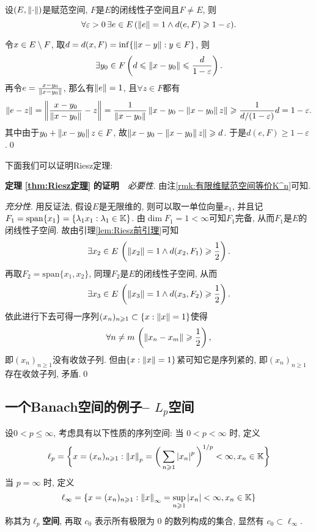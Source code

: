     \begin{Lemma}\label{lem:Riesz前引理}
    设$ (E,\left\| \cdot \right\|) $是赋范空间, $ F $是$ E $的闭线性子空间且$ F\ne E $, 则
    \[
    \forall\varepsilon>0\,\exists e\in E\,(\left\| e \right\|=1\land d(e,F)\geqslant 1-\varepsilon).
    \]
    \end{Lemma}
    \begin{Proof}
    令$ x\in E\setminus F $, 取$ d=d(x,F)=\inf\{ \left\| x-y \right\| : y\in F \} $, 则
    \[
    \exists y_0\in F\left(d\leqslant\left\| x-y_0 \right\|\leqslant\frac{d}{1-\varepsilon}\right).
    \]
    再令$ e=\frac{x-y_0}{\left\| x-y_0 \right\|} $, 那么有$ \left\| e \right\|=1 $, 且$ \forall z\in F $都有
    \[
    \left\| e-z \right\|=\left\| \frac{x-y_0}{\left\| x-y_0 \right\|}-z \right\|=\frac{1}{\left\| x-y_0 \right\|}\left\| x-y_0-\left\| x-y_0 \right\|z \right\|\geqslant\frac{1}{d/(1-\varepsilon)}d=1-\varepsilon.
    \]
    其中由于$ y_0+\left\| x-y_0 \right\|z\in F $, 故$ \left\| x-y_0-\left\| x-y_0 \right\|z \right\|\geqslant d $. 于是$ d(e,F)\geqslant 1-\varepsilon $.\qed
    \end{Proof}

    下面我们可以证明Riesz定理:

    \textbf{定理\,\,\ref{thm:Riesz定理}\,\,的证明}\ \ \textsl{必要性}. 由注\ref{rmk:有限维赋范空间等价K^n}可知.

    \textsl{充分性}. 用反证法, 假设$ E $是无限维的, 则可以取一单位向量$ x_1 $, 并且记$ F_1=\mathrm{span}\{x_1\}=\{ \lambda_1x_1 : \lambda_1\in\mathbb{K} \} $. 由$ \dim F_1=1<\infty $可知$ F_1 $完备, 从而$ F_1 $是$ E $的闭线性子空间. 故由引理\ref{lem:Riesz前引理}可知
    \[
    \exists x_2\in E\,\left(\left\| x_2 \right\|=1\land d(x_2,F_1)\geqslant\frac{1}{2}\right).
    \]
    再取$ F_2=\mathrm{span}\{x_1,x_2\} $, 同理$ F_2 $是$ E $的闭线性子空间, 从而
    \[
    \exists x_3\in E\,\left(\left\| x_3 \right\|=1\land d(x_3,F_2)\geqslant\frac{1}{2}\right).
    \]
    依此进行下去可得一序列$ (x_n)_{n\geqslant 1}\subset\{ x : \left\| x \right\|=1 \} $使得
    \[
    \forall n\ne m\,\left(\left\| x_n-x_m \right\|\geqslant\frac{1}{2}\right),
    \]
    即$ (x_n)_{n\geqslant 1} $没有收敛子列. 但由$ \{ x : \left\| x \right\|=1 \} $紧可知它是序列紧的, 即$ (x_n)_{n\geqslant 1} $存在收敛子列, 矛盾.\qed

    \subsection{一个Banach空间的例子-- $ L_p $空间}

    \begin{Definition}[$ \ell_{p} $空间]\label{def:lp空间}
        设$ 0<p\leqslant\infty $, 考虑具有以下性质的序列空间:
        当 $ 0<p<\infty $ 时, 定义
        \[
            \ell_{p}=\bigg\{ x=(x_{n})_{n\geqslant1}: \left\| x \right\|_{p}=\bigg( \sum\limits_{n\geqslant1}\left| x_{n} \right| ^{p} \bigg)^{1/p}<\infty, x_{n}\in\mathbb{K} \bigg\}
        \]
         当 $ p=\infty $ 时, 定义
         \[
             \ell_{\infty}=\{ x=(x_{n})_{n\geqslant1}:\left\| x \right\|_{\infty}=\sup_{n\geqslant1}\left| x_{n} \right| <\infty, x_{n}\in\mathbb{K} \}
         \]
         称其为\textbf{$ \ell_{p} $空间}, 再取 $ c_{0} $ 表示所有极限为 $ 0 $ 的数列构成的集合, 显然有 $ c_{0}\subset\ell_{\infty} $.
    \end{Definition}

